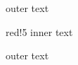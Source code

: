 \documentclass{article}
\begin{document}
outer text
\begin{colorstrip}{red!5}
inner text
\end{colorstrip}
outer text
\end{document}
